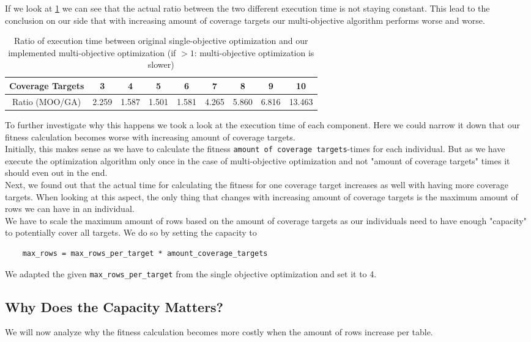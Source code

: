 If we look at \cref{tbl:ratio_coverage_targets} we can see that the actual ratio between the two different execution time is not staying constant. This lead to the conclusion on our side that with increasing amount of coverage targets our multi-objective algorithm performs worse and worse.

\begin{table}
	\centering
	\caption{Ratio of execution time between original single-objective optimization and our implemented multi-objective optimization (if $>1$: multi-objective optimization is slower)}
	\begin{tabular}{c|c|c|c|c|c|c|c|c}
		Coverage Targets & 3 & 4 & 5 & 6 & 7 & 8 & 9 & 10 \\ 
		\hline
		Ratio (MOO/GA) & 2.259 & 1.587 & 1.501 & 1.581 & 4.265 & 5.860 & 6.816 & 13.463
	\end{tabular} 
	\label{tbl:ratio_coverage_targets}
\end{table}

To further investigate why this happens we took a look at the execution time of each component. Here we could narrow it down that our fitness calculation becomes worse with increasing amount of coverage targets.\\
Initially, this makes sense as we have to calculate the fitness \verb|amount of coverage targets|-times for each individual. But as we have execute the optimization algorithm only once in the case of multi-objective optimization and not "amount of coverage targets" times it should even out in the end.\\
Next, we found out that the actual time for calculating the fitness for one coverage target increases as well with having more coverage targets. When looking at this aspect, the only thing that changes with increasing amount of coverage targets is the maximum amount of rows we can have in an individual.\\
We have to scale the maximum amount of rows based on the amount of coverage targets as our individuals need to have enough "capacity" to potentially cover all targets. We do so by setting the capacity to
\begin{verbatim}
	max_rows = max_rows_per_target * amount_coverage_targets
\end{verbatim}
We adapted the given \verb|max_rows_per_target| from the single objective optimization and set it to 4.

\subsection{Why Does the Capacity Matters?}
\label{sec:why_capacity_matters}
We will now analyze why the fitness calculation becomes more costly when the amount of rows increase per table.

